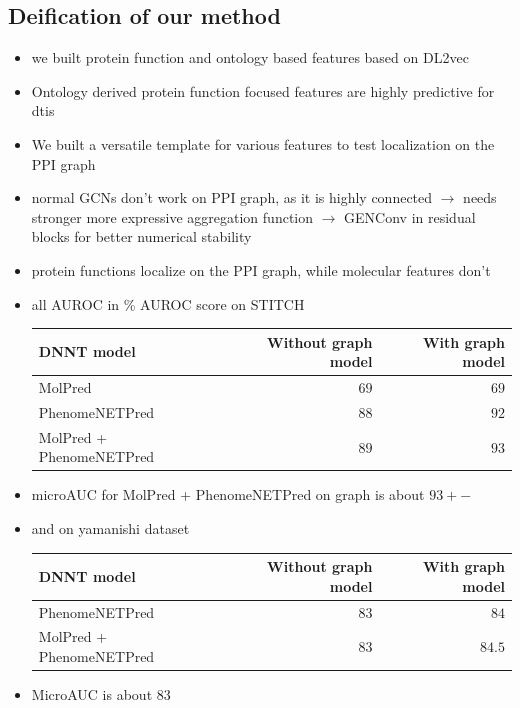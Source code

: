 \documentclass{bioinfo}
\begin{document}
\subsection{Deification of our method}
\begin{itemize}
	\item we built protein function and ontology based features based on DL2vec
	\item Ontology derived protein function focused features are highly predictive for dtis
	\item We built a versatile template for various features to test localization on the PPI graph
	\item normal GCNs don't work on PPI graph, as it is highly connected $\rightarrow$ needs stronger more expressive aggregation function $\rightarrow$ GENConv in residual blocks for better numerical stability
	\item protein functions localize on the PPI graph, while molecular features don't
	\item all AUROC in \% AUROC score on STITCH
	
	\begin{tabular}{|l|r|r|}
		\hline
		DNNT model&Without graph model&With graph model\\
		\hline
		MolPred&$69$&$69$\\
		PhenomeNETPred&$88$&$92$\\
		\hline
		MolPred + PhenomeNETPred & $89$ & $93$\\
		\hline
	\end{tabular}
	\item microAUC for MolPred + PhenomeNETPred on graph is about $93+-$
	\item and on yamanishi dataset
	
	\begin{tabular}{|l|r|r|}
		\hline
		DNNT model&Without graph model&With graph model\\
		\hline
		PhenomeNETPred&$83$&$84$\\
		\hline
		MolPred + PhenomeNETPred & $83$ & $84.5$\\
		\hline
	\end{tabular}
	\item MicroAUC is about $83$
\end{itemize}
\end{document}
